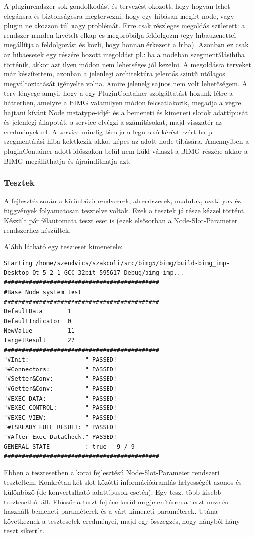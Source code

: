 \documentclass[a4paper,12pt,oneside]{report}
\begin{document}
A pluginrendszer sok gondolkodást és tervezést okozott, hogy hogyan lehet elegánsra és biztonságosra megtervezni, hogy egy hibásan megírt node, vagy plugin ne okozzon túl nagy problémát. Erre csak részleges megoldás született: a rendszer minden kivételt elkap és megpróbálja feldolgozni (egy hibaüzenettel megállítja a feldolgozást és közli, hogy honnan érkezett a hiba). Azonban ez csak az hibaesetek egy részére hozott megoldást pl.: ha a nodeban szegmentálásihiba történik, akkor azt ilyen módon nem lehetséges jól kezelni. A megoldásra terveket már készítettem, azonban a jelenlegi architektúra jelentős szintű utólagos megváltoztatását igényelte volna. Amire jelenelg sajnos nem volt lehetőségem. A terv lényege annyi, hogy a egy PluginContainer szolgáltatást hozunk létre a háttérben, amelyre a BIMG valamilyen módon felcsatlakozik, megadja a végre hajtani kívánt Node metatype-idjét és a bemeneti és kimeneti slotok adattípusát és jelenlegi állapotát, a service elvégzi a számításokat, majd visszatér az eredményekkel. A service mindig tárolja a legutolsó kérést ezért ha pl szegmentálási hiba keletkezik akkor képes az adott node tiltására. Amennyiben a pluginContainer adott időszakon belül nem küld választ a BIMG részére akkor a BIMG megállíthatja és újraindíthatja azt.

\subsubsection{Tesztek}
A fejlesztés során a különböző rendszerek, alrendszerek, modulok, osztályok és függvények folyamatosan tesztelve voltak. Ezek a tesztek jó része kézzel történt. Készült pár félautomata teszt eset is (ezek elsősorban a Node-Slot-Parameter rendszerhez készültek.

Alább látható egy teszteset kimenetele:
\begin{lstlisting}
Starting /home/szendvics/szakdoli/src/bimg5/bimg/build-bimg_imp-Desktop_Qt_5_2_1_GCC_32bit_595617-Debug/bimg_imp...
############################################
#Base Node system test
############################################
DefaultData       1
DefaultIndicator  0
NewValue          11
TargetResult      22
############################################
"#Init:                " PASSED!
"#Connectors:          " PASSED!
"#Setter&Conv:         " PASSED!
"#Getter&Conv:         " PASSED!
"#EXEC-DATA:           " PASSED!
"#EXEC-CONTROL:        " PASSED!
"#EXEC-VIEW:           " PASSED!
"#ISREADY FULL RESULT: " PASSED!
"#After Exec DataCheck:" PASSED!
GENERAL STATE          : true   9 / 9
############################################
\end{lstlisting}
Ebben a tesztesetben a korai fejlesztésú Node-Slot-Parameter rendszert teszteltem. Konkrétan két slot közötti információáramlás helyességét azonos és különböző (de konvertálható adattípusok esetén). Egy teszt több kisebb tesztesetből áll. Először a teszt fejléce kerül megjelenítésre: a teszt neve és használt bemeneti paraméterek és a várt kimeneti paraméterek. Utána következnek a tesztesetek eredményei, majd egy összegzés, hogy hányból hány teszt sikerült. 
\end{document}
